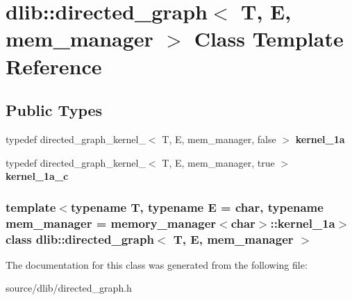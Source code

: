 \hypertarget{classdlib_1_1directed__graph}{
\section{dlib::directed\_\-graph$<$ T, E, mem\_\-manager $>$ Class Template Reference}
\label{classdlib_1_1directed__graph}
}
\subsection*{Public Types}
\begin{DoxyCompactItemize}
\item 
\hypertarget{classdlib_1_1directed__graph_a65ce21ff3926ab6c85a17ecec725aa77}{
typedef directed\_\-graph\_\-kernel\_$<$ T, E, mem\_\-manager, false $>$ {\bfseries kernel\_\-1a}}
\label{classdlib_1_1directed__graph_a65ce21ff3926ab6c85a17ecec725aa77}

\item 
\hypertarget{classdlib_1_1directed__graph_a80c78956bd7695021e8a60a872467fbd}{
typedef directed\_\-graph\_\-kernel\_$<$ T, E, mem\_\-manager, true $>$ {\bfseries kernel\_\-1a\_\-c}}
\label{classdlib_1_1directed__graph_a80c78956bd7695021e8a60a872467fbd}

\end{DoxyCompactItemize}
\subsubsection*{template$<$typename T, typename E = char, typename mem\_\-manager = memory\_\-manager$<$char$>$::kernel\_\-1a$>$ class dlib::directed\_\-graph$<$ T, E, mem\_\-manager $>$}



The documentation for this class was generated from the following file:\begin{DoxyCompactItemize}
\item 
source/dlib/directed\_\-graph.h\end{DoxyCompactItemize}
